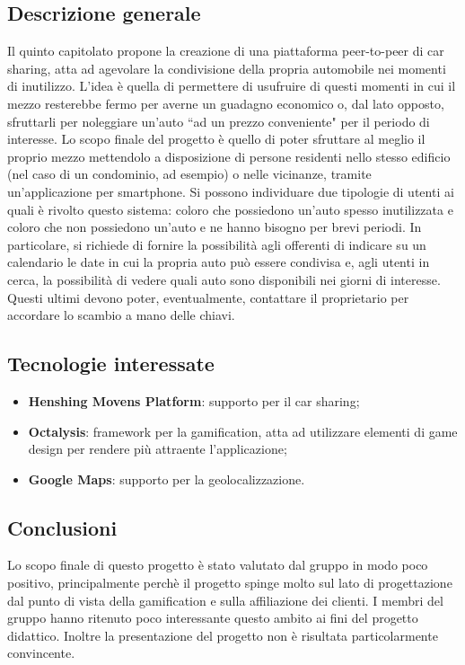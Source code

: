 \documentclass[11pt,a4paper]{article}
\begin{document}
\subsection{Descrizione generale}
Il quinto capitolato propone la creazione di una piattaforma peer-to-peer di car sharing, atta ad agevolare la condivisione della propria automobile nei momenti di inutilizzo. L'idea è quella di permettere di usufruire di questi momenti in cui il mezzo resterebbe fermo per averne un guadagno economico o, dal lato opposto, sfruttarli per noleggiare un'auto ``ad un prezzo conveniente" per il periodo di interesse.  
Lo scopo finale del progetto è quello di poter sfruttare al meglio il proprio mezzo mettendolo a disposizione di persone residenti nello stesso edificio (nel caso di un condominio, ad esempio) o nelle vicinanze, tramite un'applicazione per smartphone. 
Si possono individuare due tipologie di utenti ai quali è rivolto questo sistema: coloro che possiedono un'auto spesso inutilizzata e coloro che non possiedono un'auto e ne hanno bisogno per brevi periodi.
In particolare, si richiede di fornire la possibilità agli offerenti di indicare su un calendario le date in cui la propria auto può essere condivisa e, agli utenti in cerca, la possibilità di vedere quali auto sono disponibili nei giorni di interesse. Questi ultimi devono poter, eventualmente, contattare il proprietario per accordare lo scambio a mano delle chiavi. 
\subsection{Tecnologie interessate}
\begin{itemize}
\item \textbf{Henshing Movens Platform}: supporto per il car sharing;
\item \textbf{Octalysis}: framework per la gamification, atta ad utilizzare elementi di game design per rendere più attraente l'applicazione;
\item \textbf{Google Maps}: supporto per la geolocalizzazione.
\end{itemize}
\subsection{Conclusioni}
Lo scopo finale di questo progetto è stato valutato dal gruppo in modo poco positivo, principalmente perchè il progetto spinge molto sul lato di progettazione dal punto di vista della gamification e sulla affiliazione dei clienti. I membri del gruppo hanno ritenuto poco interessante questo ambito ai fini del progetto didattico. Inoltre la presentazione del progetto non è risultata particolarmente convincente.
\newpage
\end{document}
